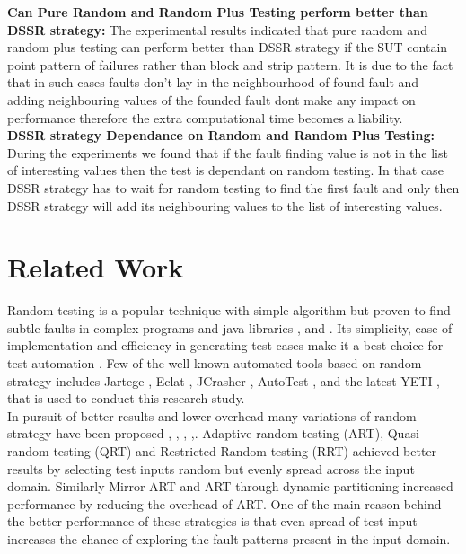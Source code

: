 \documentclass[conference]{IEEEtran}
\begin{document}
\indent \textbf{Can Pure Random and Random Plus Testing perform better than DSSR strategy:}
The experimental results indicated that pure random and random plus testing can perform better than DSSR strategy if the SUT contain point pattern of failures rather than block and strip pattern. It is due to the fact that in such cases faults don't lay in the neighbourhood of found fault and adding neighbouring values of the founded fault dont make any impact on performance therefore the extra computational time becomes a liability.\\
\indent \textbf{DSSR strategy Dependance on Random and Random Plus Testing:}
During the experiments we found that if the fault finding value is not in the list of interesting values then the test is dependant on random testing. In that case DSSR strategy has to wait for random testing to find the first fault and only then DSSR strategy will add its neighbouring values to the list of interesting values.



\section{Related Work}\label{sec:rw}

Random testing is a popular technique with simple algorithm but proven to find subtle faults in complex programs and java libraries \cite{Pacheco2005}, \cite{Csallner2004} and \cite{Claessen2000a}. Its simplicity, ease of implementation and efficiency in generating test cases make it a best choice for test automation \cite{Hamlet1994}. Few of the well known automated tools based on random strategy includes Jartege \cite{Oriat2004}, Eclat \cite{Pacheco2005}, JCrasher \cite{Csallner2004}, AutoTest \cite{Ciupa2007}, \cite{Ciupa2008a} and the latest YETI \cite{Oriol2010}, \cite{Oriol2012}  that is used to conduct this research study.\\

In pursuit of better results and lower overhead many variations of random strategy have been proposed \cite{Chen2010}, \cite{Chen2005}, \cite{Chan2002}, \cite{Chen2004a},\cite{Chen2003}. Adaptive random testing (ART), Quasi-random testing (QRT) and Restricted Random testing (RRT) achieved better results by selecting test inputs random but evenly spread across the input domain. Similarly Mirror ART and ART through dynamic partitioning increased performance by reducing the overhead of ART. One of the main reason behind the better performance of these strategies is that even spread of test input increases the chance of exploring the fault patterns present in the input domain.\\ 
\end{document}

